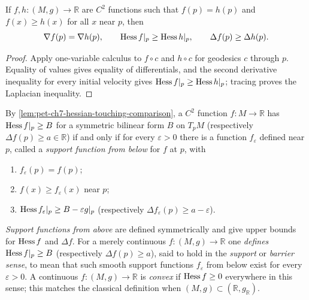 \begin{lemma}
  \label{lem:pet-ch7-hessian-touching-comparison}

  If $f,h:(M,g)\to\mathbb{R}$ are $C^2$ functions such that $f(p)=h(p)$ and
  $f(x)\ge h(x)$ for all $x$ near $p$, then
  \[
    \nabla f(p)=\nabla h(p),\qquad \operatorname{Hess} f|_p\ge \operatorname{Hess} h|_p,\qquad \Delta f(p)\ge \Delta h(p).
  \]
\end{lemma}
\begin{proof}
  \sketch
  Apply one-variable calculus to \(f\circ c\) and \(h\circ c\) for geodesics \(c\) through \(p\). Equality of values gives equality of differentials, and the second derivative inequality for every initial velocity gives \(\operatorname{Hess} f|_p\ge\operatorname{Hess} h|_p\); tracing proves the Laplacian inequality.
\end{proof}

\begin{definition}
  \label{def:pet-ch7-support-function}

  By \cref{lem:pet-ch7-hessian-touching-comparison}, a $C^2$ function
  $f:M\to\mathbb{R}$ has $\operatorname{Hess} f|_p\ge B$ for a symmetric bilinear form $B$ on $T_pM$
  (respectively $\Delta f(p)\ge a\in\mathbb{R}$) if and only if for every
  $\varepsilon>0$ there is a function $f_\varepsilon$ defined near $p$, called a
  \emph{support function from below} for $f$ at $p$, with
  \begin{enumerate}
    \item[(1)] $f_\varepsilon(p)=f(p)$;
    \item[(2)] $f(x)\ge f_\varepsilon(x)$ near $p$;
    \item[(3)] $\operatorname{Hess} f_\varepsilon|_p\ge B-\varepsilon g|_p$ (respectively
      $\Delta f_\varepsilon(p)\ge a-\varepsilon$).
  \end{enumerate}
  \emph{Support functions from above} are defined symmetrically and give upper
  bounds for $\operatorname{Hess} f$ and $\Delta f$. For a merely continuous $f:(M,g)\to\mathbb{R}$
  one \emph{defines} $\operatorname{Hess} f|_p\ge B$ (respectively $\Delta f(p)\ge a$), said to
  hold in the \emph{support} or \emph{barrier sense}, to mean that such smooth
  support functions $f_\varepsilon$ from below exist for every $\varepsilon>0$.
  A continuous $f:(M,g)\to\mathbb{R}$ is \emph{convex} if $\operatorname{Hess} f\ge0$ everywhere in
  this sense; this matches the classical definition when $(M,g)\subset(\mathbb{R},g_\mathbb{R})$.
\end{definition}

